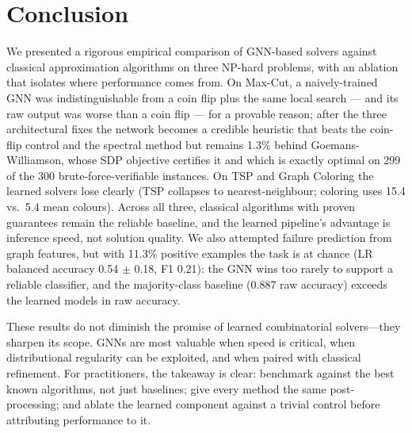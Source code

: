 \documentclass[11pt]{article}
\begin{document}
\section{Conclusion}

We presented a rigorous empirical comparison of GNN-based solvers against classical approximation algorithms on three NP-hard problems, with an ablation that isolates where performance comes from.
On Max-Cut, a naively-trained GNN was indistinguishable from a coin flip plus the same local search --- and its raw output was worse than a coin flip --- for a provable reason; after the three architectural fixes the network becomes a credible heuristic that beats the coin-flip control and the spectral method but remains 1.3\% behind Goemans-Williamson, whose SDP objective certifies it and which is exactly optimal on 299 of the 300 brute-force-verifiable instances.
On TSP and Graph Coloring the learned solvers lose clearly (TSP collapses to nearest-neighbour; coloring uses 15.4 vs.\ 5.4 mean colours).
Across all three, classical algorithms with proven guarantees remain the reliable baseline, and the learned pipeline's advantage is inference speed, not solution quality.
We also attempted failure prediction from graph features, but with 11.3\% positive examples the task is at chance (LR balanced accuracy 0.54 $\pm$ 0.18, F1 0.21): the GNN wins too rarely to support a reliable classifier, and the majority-class baseline (0.887 raw accuracy) exceeds the learned models in raw accuracy.

These results do not diminish the promise of learned combinatorial solvers---they sharpen its scope.
GNNs are most valuable when speed is critical, when distributional regularity can be exploited, and when paired with classical refinement.
For practitioners, the takeaway is clear: benchmark against the best known algorithms, not just baselines; give every method the same post-processing; and ablate the learned component against a trivial control before attributing performance to it.



\end{document}
